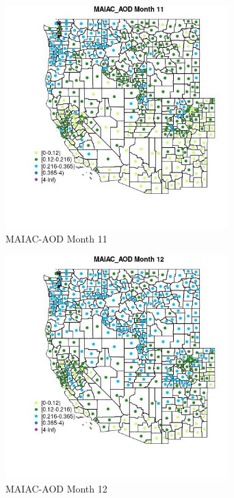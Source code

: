 \begin{figure} 
\centering  
\includegraphics[width=0.77\textwidth]{Code_Outputs/df_report_ML_predictors_CountyCentroid_Locations_Dates_2008-01-01to2018-12-31_MapObsMo11MAIAC_AOD.jpg} 
\caption{\label{fig:df_report_ML_predictors_CountyCentroid_Locations_Dates_2008-01-01to2018-12-31MapObsMo11MAIAC_AOD}MAIAC-AOD Month 11} 
\end{figure} 
 

\begin{figure} 
\centering  
\includegraphics[width=0.77\textwidth]{Code_Outputs/df_report_ML_predictors_CountyCentroid_Locations_Dates_2008-01-01to2018-12-31_MapObsMo12MAIAC_AOD.jpg} 
\caption{\label{fig:df_report_ML_predictors_CountyCentroid_Locations_Dates_2008-01-01to2018-12-31MapObsMo12MAIAC_AOD}MAIAC-AOD Month 12} 
\end{figure} 
 

